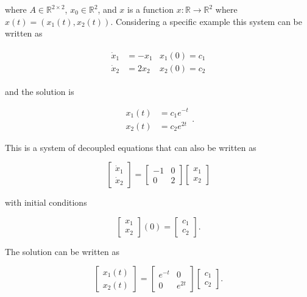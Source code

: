 \documentclass[12pt]{article}
\theoremstyle{definition}
\begin{document}
where $A \in \mathbb{R}^{2 \times 2}$, $x_0 \in \mathbb{R}^2$, and $x$ is a function $x : \mathbb{R} \rightarrow \mathbb{R}^2$ where $x(t) = (x_1(t), x_2(t))$. Considering a specific example this system can be written as

\begin{equation*}
\begin{matrix}
\begin{split}
\dot x_1 &= -x_1 & x_1(0) = c_1 \\
\dot x_2 &= 2x_2 & x_2(0) = c_2
\end{split}
\end{matrix}
\end{equation*}

and the solution is

\begin{equation*}
\begin{split}
x_1(t) &= c_1 e^{-t} \\
x_2(t) &= c_2 e^{2t}
\end{split}
.
\end{equation*}

This is a system of decoupled equations that can also be written as


\begin{equation*}
\begin{bmatrix}
\dot x_1 \\
\dot x_2
\end{bmatrix}
= 
\begin{bmatrix}
-1 & 0 \\
0 & 2 
\end{bmatrix}
\begin{bmatrix}
x_1 \\
x_2
\end{bmatrix}
\end{equation*}

with initial conditions


\begin{equation*}
\begin{bmatrix}
x_1 \\
x_2
\end{bmatrix}
(0) =
\begin{bmatrix}
c_1 \\
c_2
\end{bmatrix}
.
\end{equation*}


The solution can be written as

\begin{equation*}
\begin{bmatrix}
x_1(t) \\
x_2(t)
\end{bmatrix}
=
\begin{bmatrix}
e^{-t} & 0 \\
0 & e^{2t}
\end{bmatrix}
\begin{bmatrix}
c_1 \\
c_2
\end{bmatrix}
.
\end{equation*}
\end{document}
